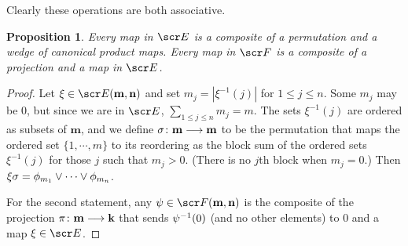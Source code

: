 \documentclass{amsart}
\newtheorem{prop}{Proposition}[section]
\theoremstyle{definition}
\numberwithin{equation}{section}
\newcommand{\bk}{\mathbf{k}}
\newcommand{\bm}{\mathbf{m}}
\newcommand{\bn}{\mathbf{n}}
\begin{document}
Clearly these operations are both associative.

\begin{prop}\label{decompose}
 Every map in $\sE$ is a composite of a permutation and a wedge of canonical product maps.  Every map in $\sF$ is a composite of a projection and a map in $\sE$. 
\end{prop}

\begin{proof} Let $\xi\in\sE(\bm, \bn)$ and set $m_j=|\xi^{-1}(j)|$ for $1\leq j\leq n$.  Some $m_j$ may be $0$, but since we are in $\sE$,  $\sum_{1\leq j\leq n} m_j = m$.   The sets $\xi^{-1}(j)$ are ordered as subsets of $\bm$, and we define $\si\colon \bm\rtarr \bm$ to be the permutation that maps the ordered set $\{1, \cdots, m\}$ to its reordering as the block sum of the ordered sets $\xi^{-1}(j)$ for those $j$ such that $m_j> 0$. (There is no $j$th block when $m_j=0$.)    Then $\xi\sigma = \phi_{m_1}\vee \cdots \vee \phi_{m_n}$.  

For the second statement, any  $\ps \in \sF(\bm,\bn)$ is the composite of the projection $\pi\colon \bm\rtarr \bk$ that sends $\psi^{-1}(0)$ (and no other elements) to $0$ and a map  $\xi\in\sE$.
\end{proof}
\end{document}
